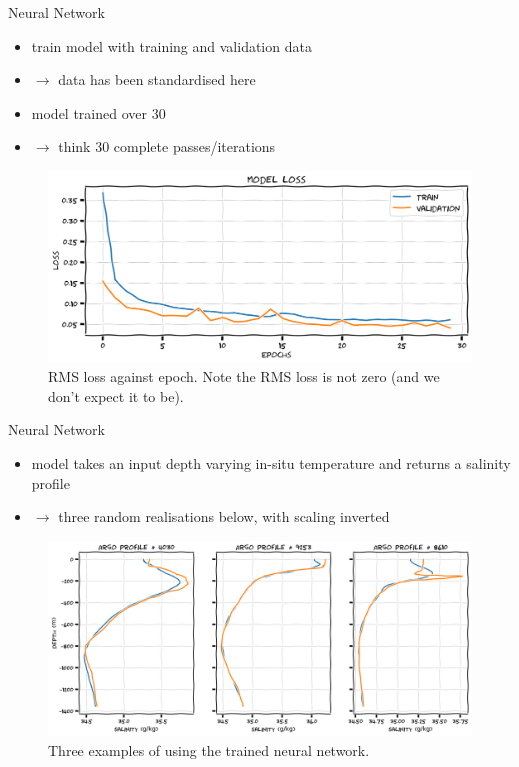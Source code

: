 \documentclass[xcolor=x11names,compress]{beamer}
\renewcommand{\(}{\begin{columns}}
\renewcommand{\)}{\end{columns}}
\newcommand{\<}[1]{\begin{column}{#1}}
\renewcommand{\>}{\end{column}}
\begin{document}
\begin{frame}{Neural Network}

\begin{itemize}
  \item train model with training and validation data
  \item[] $\to$ data has been standardised here
  \item model trained over 30 
  \item[] $\to$ think 30 complete passes/iterations
\end{itemize}

\begin{figure}
  \includegraphics[width=\textwidth]{argo_data_neural_network}
  \caption{RMS loss against epoch. Note the RMS loss is not zero (and we don't
  expect it to be).}
\end{figure}

\end{frame}


\begin{frame}{Neural Network}

\begin{itemize}
  \item model takes an input depth varying {\tiny in-situ} temperature and
  returns a salinity profile
  \item[] $\to$ three random realisations below, with scaling inverted
\end{itemize}

\begin{figure}
  \includegraphics[width=\textwidth]{argo_data_neural_network_predict}
  \caption{Three examples of using the trained neural network.}
\end{figure}

\end{frame}
\end{document}
